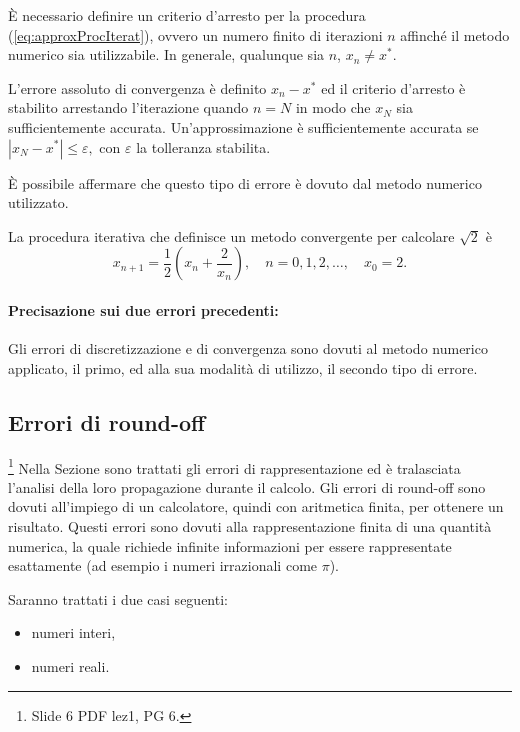 È necessario definire un criterio d'arresto per la procedura (\ref{eq:approxProcIterat}), ovvero un numero finito di iterazioni $n$ affinché il metodo numerico sia utilizzabile. In generale, qualunque sia $n$, $x_n\neq x^*$.

L'errore assoluto di convergenza è definito $x_n-x^*$ ed il criterio d'arresto è stabilito arrestando l'iterazione quando $n=N$ in modo che $x_N$ sia sufficientemente accurata. Un'approssimazione è sufficientemente accurata se $|x_N-x^*|\leq\varepsilon,$ con $\varepsilon$ la tolleranza stabilita.

È possibile affermare che questo tipo di errore è dovuto dal metodo numerico utilizzato.

\begin{example}
	La procedura iterativa che definisce un metodo convergente per calcolare $\sqrt{2}$ è
	\begin{equation}\label{eq:approxRad2ProcIterat}
		x_{n+1}=\frac{1}{2}\left(x_n+\frac{2}{x_n}\right),\quad n=0,1,2,\hdots,\quad x_0=2.
	\end{equation}
\end{example}

\paragraph{Precisazione sui due errori precedenti:} Gli errori di discretizzazione e di convergenza sono dovuti al metodo numerico applicato, il primo, ed alla sua modalità di utilizzo, il secondo tipo di errore.

\subsection{Errori di round-off}\footnote{Slide 6 PDF lez1, PG 6.}
Nella Sezione sono trattati gli errori di rappresentazione ed è tralasciata l'analisi della loro propagazione durante il calcolo. Gli errori di round-off sono dovuti all'impiego di un calcolatore, quindi con aritmetica finita, per ottenere un risultato. Questi errori sono dovuti alla rappresentazione finita di una quantità numerica, la quale richiede infinite informazioni  per essere rappresentate esattamente (ad esempio i numeri irrazionali come $\pi$). 

Saranno trattati i due casi seguenti:
\begin{itemize}
	\item numeri interi,
	\item numeri reali.
\end{itemize}

